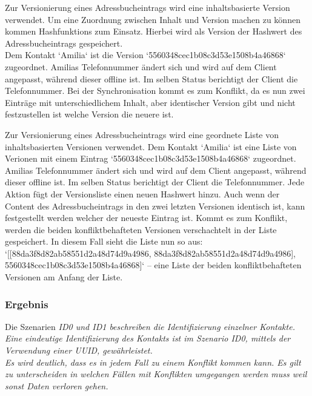 \begin{description}[leftmargin=0.5cm,style=nextline]
  \item[Szenario V3 -- Inhaltsbasierte Version:]%
    Zur Versionierung eines Adressbucheintrags wird eine inhaltsbasierte Version verwendet. Um eine Zuordnung zwischen Inhalt und Version machen zu können kommen \Glspl{Hashfunktion} zum Einsatz. Hierbei wird als Version der Hashwert des Adressbucheintrags gespeichert.\\
    Dem Kontakt `Amilia` ist die Version `5560348cec1b08c3d53e1508b4a46868` zugeordnet. Amilias Telefonnummer ändert sich und wird auf dem Client angepasst, während dieser offline ist.
    Im selben Status berichtigt der Client die Telefonnummer. Bei der Synchronisation kommt es zum Konflikt, da es nun zwei Einträge mit unterschiedlichem Inhalt, aber identischer Version gibt und nicht festzustellen ist welche Version die neuere ist.\\
  \item[Szenario V4 -- Liste von inhaltsbasierten Versionen:]
    Zur Versionierung eines Adressbucheintrags wird eine geordnete Liste von inhaltsbasierten Versionen verwendet.
    Dem Kontakt `Amilia` ist eine Liste von Verionen mit einem Eintrag `5560348cec1b08c3d53e1508b4a46868` zugeordnet.
    Amilias Telefonnummer ändert sich und wird auf dem Client angepasst, während dieser offline ist. Im selben Status berichtigt der Client die Telefonnummer.
    Jede Aktion fügt der Versionsliste einen neuen Hashwert hinzu.
    Auch wenn der Content des Adressbucheintrags in den zwei letzten Versionen identisch ist, kann festgestellt werden welcher der neueste Eintrag ist.
    Kommt es zum Konflikt, werden die beiden konfliktbehafteten Versionen verschachtelt in der Liste gespeichert. In diesem Fall sieht die Liste nun so aus: `[[88da3f8d82ab58551d2a48d74d9a4986, 88da3f8d82ab58551d2a48d74d9a4986], 5560348cec1b08c3d53e1508b4a46868]` -- eine Liste der beiden konfliktbehafteten Versionen am Anfang der Liste.
\end{description}
%
%
\subsubsection*{Ergebnis}
Die Szenarien \it{ID0} und \it{ID1} beschreiben die Identifizierung einzelner Kontakte. Eine eindeutige Identifizierung des Kontakts ist im Szenario \it{ID0}, mittels der Verwendung einer \gls{UUID}, gewährleistet.\\
Es wird deutlich, dass es in jedem Fall zu einem Konflikt kommen kann. Es gilt zu unterscheiden in welchen Fällen mit Konflikten umgegangen werden muss weil sonst Daten verloren gehen.
